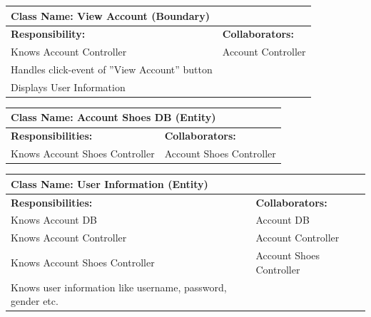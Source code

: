 \documentclass[]{article}
\begin{document}
\begin{table}[H]
    \centering
    \begin{tabular}{|p{}|p{}|}
        \hline
        \multicolumn{2}{|l|}{\textbf{Class Name:} View Account (Boundary)} \\
        \hline
        \textbf{Responsibility:} & \textbf{Collaborators:} \\
        \hline
        Knows Account Controller & Account Controller \\
        Handles click-event of ”View Account” button &  \\
        Displays User Information & \\
        \hline
    \end{tabular}
    \label{tab:view_account}
\end{table}

\begin{table}[H]
    \centering
    \begin{tabular}{|p{}|p{}|}
        \hline
        \multicolumn{2}{|l|}{\textbf{Class Name:} Account Shoes DB (Entity)} \\
        \hline
        \textbf{Responsibilities:} & \textbf{Collaborators:} \\
        \hline
        Knows Account Shoes Controller & Account Shoes Controller \\
        \hline
    \end{tabular}
    \label{tab:account_shoes_db}
\end{table}

\begin{table}[H]
    \centering
    \begin{tabular}{|p{}|p{}|}
        \hline
        \multicolumn{2}{|l|}{\textbf{Class Name:} User Information (Entity)} \\
        \hline
        \textbf{Responsibilities:} & \textbf{Collaborators:} \\
        \hline
        Knows Account DB & Account DB \\
        Knows Account Controller & Account Controller \\
        Knows Account Shoes Controller & Account Shoes Controller \\
        Knows user information like username, password, gender etc. & \\ 
        \hline
    \end{tabular}
    \label{tab:user_information}
\end{table}
\end{document}
